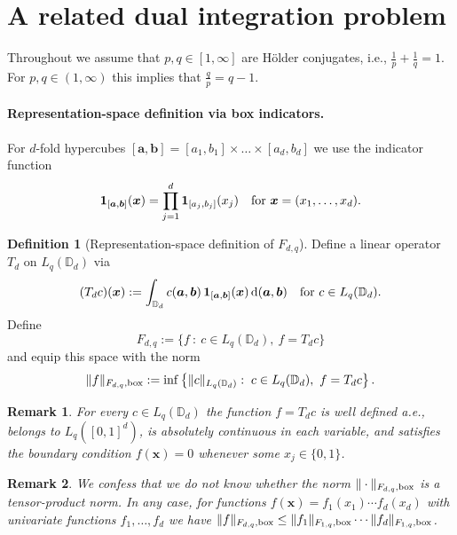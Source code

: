\documentclass[12pt]{article}
\newtheorem{remark}{Remark}
\theoremstyle{remark}
\theoremstyle{definition}
\newtheorem{dfn}[thm]{Definition}
\newcommand{\D}{\mathbb{D}}
\newcommand{\bx}{{\rm box}}
\newcommand{\rd}{\,{\rm d}}
\newcommand{\bsx}{{\boldsymbol x}}
\newcommand{\bsa}{{\boldsymbol a}}
\newcommand{\bsb}{{\boldsymbol b}}
\newcommand{\<}{\langle}
\renewcommand{\>}{\rangle}
\begin{document}
\section{A related dual integration problem}\label{sec:int}

Throughout we assume that $p,q \in [1,\infty]$ are H\"older conjugates, i.e., $
\frac1p+\frac1q=1$. For $p,q \in (1, \infty)$ this implies that $\frac{q}{p}=q-1$.

\paragraph{Representation-space definition via box indicators.}

For $d$-fold hypercubes  $[\bsa,\bsb]=[a_1,b_1]\times \ldots \times [a_d,b_d]$ we use the indicator function
\[
{\bf 1}_{[\bsa,\bsb]}(\bsx) = \prod_{j=1}^d {\bf 1}_{[a_j,b_j]}(x_j) \quad \mbox{for $\bsx=(x_1,\ldots,x_d)$.}
\]


\begin{dfn}[Representation-space definition of $F_{d,q}$]\label{def:box}
Define a linear operator $T_d$ on $L_q(\D_d)$ via 
\begin{equation}\label{eq:rep}
(T_d c)(\bsx):=\int_{\D_d} c(\bsa,\bsb)\, {\bf 1}_{[\bsa,\bsb]}(\bsx) \rd (\bsa,\bsb)
\quad\text{for }c\in L_q(\D_d).
\end{equation}
Define $$F_{d,q}:=\{f \ : \ c\in L_q(\D_d), \ f=T_dc\}$$ and equip this space with the norm 
\begin{equation}\label{eq:norm-rep}
\|f\|_{F_{d,q},\bx}:=\inf\left\{\|c\|_{L_q(\D_d)}:\;c\in L_q(\D_d), \ f=T_dc\right\}.
\end{equation}
\end{dfn}


\begin{remark}\rm
For every $c \in L_q(\D_d)$ the function $f=T_d c$ is well defined a.e., belongs to $L_q([0,1]^d)$, is absolutely continuous in each variable, and satisfies the boundary condition $f(\bsx)=0$ whenever some $x_j \in \{0,1\}$.   
\end{remark}

\begin{remark}\rm
We confess that we do not know whether the norm $\|\cdot\|_{F_{d,q},\bx}$ is a tensor-product norm. In any case, for functions $f(\bsx)=f_1(x_1)\cdots f_d(x_d)$ with univariate functions $f_1,\ldots,f_d$ we have $\|f\|_{F_{d,q},\bx} \le  \|f_1\|_{F_{1,q},\bx} \cdots \|f_d\|_{F_{1,q},\bx}$.
\end{remark}
\end{document}
